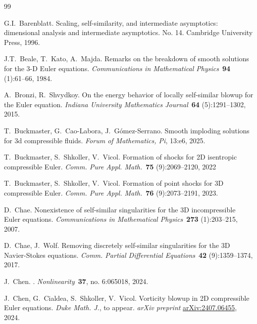 \documentclass[11pt,reqno]{amsproc}
\numberwithin{equation}{section}
\theoremstyle{remark}
\begin{document}
\begin{thebibliography}{99}


 G.I.~Barenblatt.
\newblock Scaling, self-similarity, and intermediate asymptotics: dimensional analysis and intermediate asymptotics. 
\newblock No. 14. Cambridge University Press, 1996.

J.T.~Beale, T.~Kato, A.~Majda. 
\newblock Remarks on the breakdown of smooth solutions for the 3-D Euler equations. 
\newblock \textit{Communications in Mathematical Physics}~\textbf{94} (1):61--66, 1984.

A.~Bronzi, R.~Shvydkoy. 
\newblock On the energy behavior of locally self-similar blowup for the Euler equation.
\newblock \textit{Indiana University Mathematics Journal}~\textbf{64} (5):1291--1302, 2015.

T.~Buckmaster, G.~Cao-Labora,  J.~G{\'o}mez-Serrano.
\newblock Smooth imploding solutions for 3d compressible fluids.
\newblock \textit{Forum of Mathematics, Pi}, 13:e6, 2025.

T.~Buckmaster, S.~Shkoller, V.~Vicol.
\newblock Formation of shocks for 2D isentropic compressible Euler. 
\newblock \textit{Comm. Pure Appl. Math.}~\textbf{75} (9):2069--2120, 2022

T.~Buckmaster, S.~Shkoller, V.~Vicol.
\newblock Formation of point shocks for {3D} compressible {E}uler. 
\newblock \textit{Comm. Pure Appl. Math.}~\textbf{76} (9):2073--2191, 2023.

D.~Chae. 
\newblock Nonexistence of self-similar singularities for the 3D incompressible Euler equations.
\newblock \textit{Communications in Mathematical Physics}~\textbf{273} (1):203--215, 2007.


D.~Chae, J.~Wolf.
\newblock Removing discretely self-similar singularities for the 3D Navier-Stokes equations.
\newblock \textit{Comm. Partial Differential Equations}~\textbf{42} (9):1359--1374, 2017.

J.~Chen. 
. 
\newblock \textit{Nonlinearity}~\textbf{37}, no. 6:065018, 2024.

J.~Chen, G.~Cialdea, S.~Shkoller, V.~Vicol. 
\newblock Vorticity blowup in 2D compressible Euler equations.
\newblock \textit{Duke Math. J.}, to appear. \textit{arXiv preprint} \href{https://arxiv.org/abs/2407.06455}{arXiv:2407.06455}, 2024.


\end{thebibliography}
\end{document}
